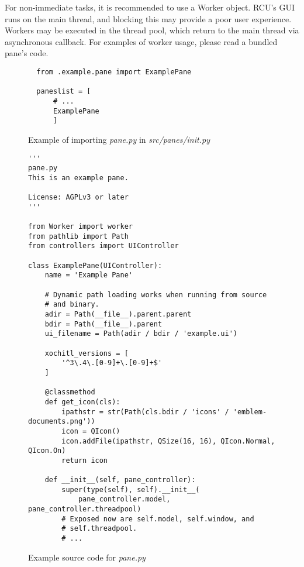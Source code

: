 For non-immediate tasks, it is recommended to use a Worker object. RCU's GUI runs on the main thread, and blocking this may provide a poor user experience. Workers may be executed in the thread pool, which return to the main thread via asynchronous callback. For examples of worker usage, please read a bundled pane's code.

\vfill

\begin{figure}[h]
\begin{verbatim}
  from .example.pane import ExamplePane

  paneslist = [
      # ...
      ExamplePane
      ]
\end{verbatim}
\caption{Example of importing \textit{pane.py} in \textit{src/panes/\textunderscore \textunderscore init\textunderscore \textunderscore.py}}
\label{fig:examplepaneimport}
\end{figure}
\vfill


\newpage
\mbox{}
\vfill

\begin{figure}[h]
\begin{verbatim}
'''
pane.py
This is an example pane.

License: AGPLv3 or later
'''

from Worker import worker
from pathlib import Path
from controllers import UIController

class ExamplePane(UIController):
    name = 'Example Pane'

    # Dynamic path loading works when running from source
    # and binary.
    adir = Path(__file__).parent.parent
    bdir = Path(__file__).parent
    ui_filename = Path(adir / bdir / 'example.ui')

    xochitl_versions = [
        '^3\.4\.[0-9]+\.[0-9]+$'
    ]

    @classmethod
    def get_icon(cls):
        ipathstr = str(Path(cls.bdir / 'icons' / 'emblem-documents.png'))
        icon = QIcon()
        icon.addFile(ipathstr, QSize(16, 16), QIcon.Normal, QIcon.On)
        return icon

    def __init__(self, pane_controller):
        super(type(self), self).__init__(
            pane_controller.model, pane_controller.threadpool)
        # Exposed now are self.model, self.window, and
        # self.threadpool.
        # ...
\end{verbatim}
\caption{Example source code for \textit{pane.py}}
\label{fig:examplepanesource}
\end{figure}

\vfill

